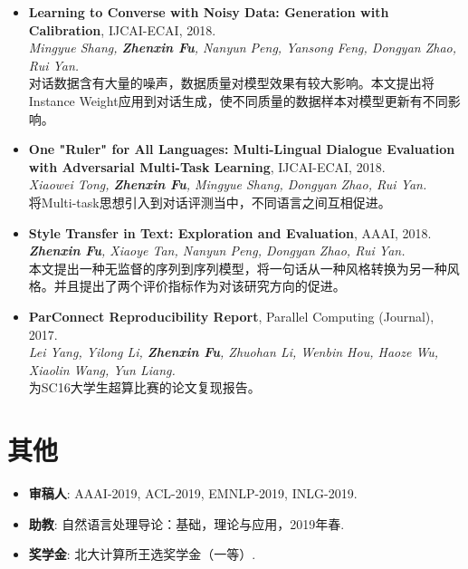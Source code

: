 \documentclass[letterpaper]{article}
\def\footerlink{https://zhenxinfu.com/zhenxinfu.pdf}
\begin{document}
\begin{itemize}
\item \textbf{Learning to Converse with Noisy Data: Generation with Calibration}, IJCAI-ECAI, 2018. \\
  {\it Mingyue Shang, \textbf{Zhenxin Fu}, Nanyun Peng, Yansong Feng, Dongyan Zhao, Rui Yan.}  \\
  对话数据含有大量的噪声，数据质量对模型效果有较大影响。本文提出将Instance Weight应用到对话生成，使不同质量的数据样本对模型更新有不同影响。

\item \textbf{One "Ruler" for All Languages: Multi-Lingual Dialogue Evaluation with Adversarial Multi-Task Learning}, IJCAI-ECAI, 2018. \\
  {\it Xiaowei Tong, \textbf{Zhenxin Fu}, Mingyue Shang, Dongyan Zhao, Rui Yan.}  \\
  将Multi-task思想引入到对话评测当中，不同语言之间互相促进。

\item \textbf{Style Transfer in Text: Exploration and Evaluation}, AAAI, 2018. \\
  {\it \textbf{Zhenxin Fu}, Xiaoye Tan, Nanyun Peng, Dongyan Zhao, Rui Yan.} \\
  本文提出一种无监督的序列到序列模型，将一句话从一种风格转换为另一种风格。并且提出了两个评价指标作为对该研究方向的促进。
  
\item \textbf{ParConnect Reproducibility Report}, Parallel Computing (Journal), 2017.\\
  {\it Lei Yang, Yilong Li, \textbf{Zhenxin Fu}, Zhuohan Li, Wenbin Hou, Haoze Wu, Xiaolin Wang, Yun Liang.} \\
  为SC16大学生超算比赛的论文复现报告。
\end{itemize}


\section*{其他}
\begin{itemize}
  \item \textbf{审稿人}: AAAI-2019, ACL-2019, EMNLP-2019, INLG-2019.
  \item \textbf{助教}: 自然语言处理导论：基础，理论与应用，2019年春.
  \item \textbf{奖学金}: 北大计算所王选奖学金（一等）.
\end{itemize}




\end{document}
